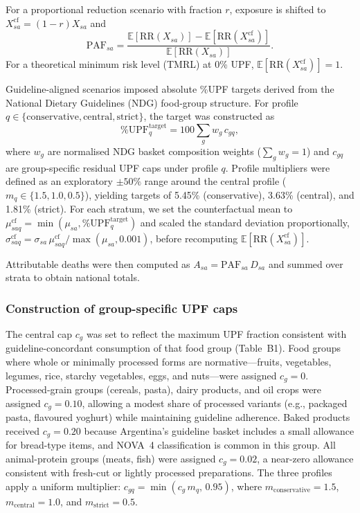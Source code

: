 ﻿\documentclass{article}
\begin{document}
For a proportional reduction scenario with fraction $r$, exposure is shifted to $X_{sa}^{\mathrm{cf}}=(1-r)X_{sa}$ and
\[
\mathrm{PAF}_{sa}=
\frac{\mathbb{E}[\mathrm{RR}(X_{sa})]-\mathbb{E}[\mathrm{RR}(X_{sa}^{\mathrm{cf}})]}
{\mathbb{E}[\mathrm{RR}(X_{sa})]}.
\]
For a theoretical minimum risk level (TMRL) at 0\% UPF, $\mathbb{E}[\mathrm{RR}(X_{sa}^{\mathrm{cf}})]=1$.

Guideline-aligned scenarios imposed absolute \%UPF targets derived from the National Dietary Guidelines (NDG) food-group structure. \citep{NDG2016} For profile $q\in\{\text{conservative},\text{central},\text{strict}\}$, the target was constructed as
\[
\%\mathrm{UPF}^{\mathrm{target}}_q = 100\sum_g w_g\,c_{gq},
\]
where $w_g$ are normalised NDG basket composition weights ($\sum_g w_g=1$) and $c_{gq}$ are group-specific residual UPF caps under profile $q$. Profile multipliers were defined as an exploratory $\pm50\%$ range around the central profile ($m_q\in\{1.5,1.0,0.5\}$), yielding targets of 5.45\% (conservative), 3.63\% (central), and 1.81\% (strict). For each stratum, we set the counterfactual mean to $\mu^{\mathrm{cf}}_{saq}=\min(\mu_{sa},\%\mathrm{UPF}^{\mathrm{target}}_q)$ and scaled the standard deviation proportionally, $\sigma^{\mathrm{cf}}_{saq}=\sigma_{sa}\,\mu^{\mathrm{cf}}_{saq}/\max(\mu_{sa},0.001)$, before recomputing $\mathbb{E}[\mathrm{RR}(X_{sa}^{\mathrm{cf}})]$.

Attributable deaths were then computed as $A_{sa}=\mathrm{PAF}_{sa}\,D_{sa}$ and summed over strata to obtain national totals. \citep{WHO2024MethodsGBD,Nilson2023}

\subsubsection*{Construction of group-specific UPF caps}
The central cap $c_g$ was set to reflect the maximum UPF fraction consistent with guideline-concordant consumption of that food group (Table~B1). Food groups where whole or minimally processed forms are normative---fruits, vegetables, legumes, rice, starchy vegetables, eggs, and nuts---were assigned $c_g=0$. Processed-grain groups (cereals, pasta), dairy products, and oil crops were assigned $c_g=0.10$, allowing a modest share of processed variants (e.g., packaged pasta, flavoured yoghurt) while maintaining guideline adherence. Baked products received $c_g=0.20$ because Argentina's guideline basket includes a small allowance for bread-type items, and NOVA~4 classification is common in this group. All animal-protein groups (meats, fish) were assigned $c_g=0.02$, a near-zero allowance consistent with fresh-cut or lightly processed preparations. The three profiles apply a uniform multiplier: $c_{gq}=\min(c_g\,m_q,\,0.95)$, where $m_{\mathrm{conservative}}=1.5$, $m_{\mathrm{central}}=1.0$, and $m_{\mathrm{strict}}=0.5$.
\end{document}
